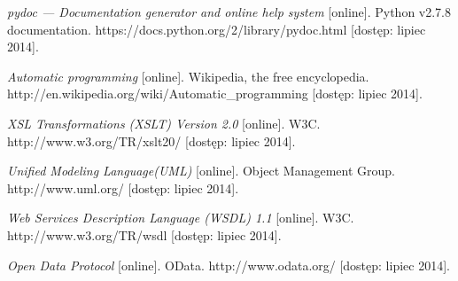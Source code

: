 \begin{thebibliography}{}
  \emph{pydoc — Documentation generator and online help system} [online].
  Python v2.7.8 documentation.
  https://docs.python.org/2/library/pydoc.html [dostęp: lipiec 2014].
 
  \emph{Automatic programming} [online].
  Wikipedia, the free encyclopedia.
  http://en.wikipedia.org/wiki/Automatic\_programming [dostęp: lipiec 2014].
 
  \emph{XSL Transformations (XSLT) Version 2.0} [online].
  W3C.
  http://www.w3.org/TR/xslt20/ [dostęp: lipiec 2014].
 
  \emph{Unified Modeling Language\texttrademark (UML\textregistered)} [online].
  Object Management Group.
  http://www.uml.org/ [dostęp: lipiec 2014].
 
  \emph{Web Services Description Language (WSDL) 1.1} [online].
  W3C.
  http://www.w3.org/TR/wsdl [dostęp: lipiec 2014].
 
  \emph{Open Data Protocol} [online].
  OData.
  http://www.odata.org/ [dostęp: lipiec 2014].
  
\end{thebibliography}
